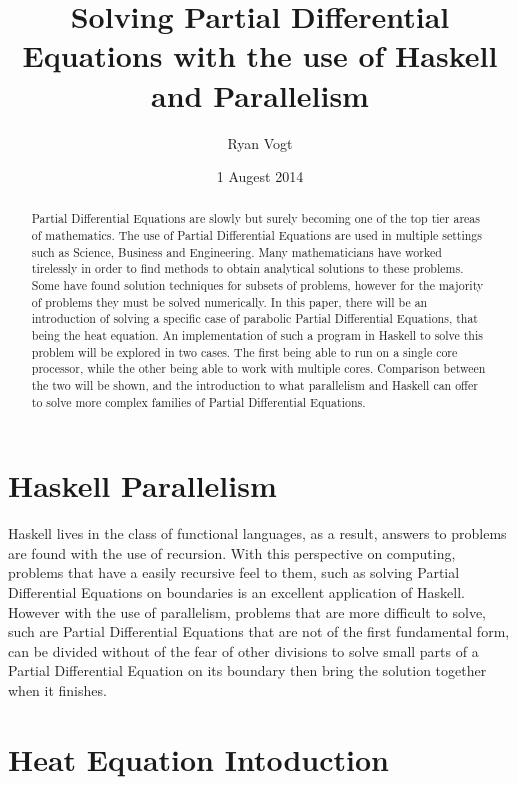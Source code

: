 \documentclass{sig-alternate}
\begin{document}
\title{Solving Partial Differential Equations with the use of Haskell and Parallelism}
\author{
\alignauthor
Ryan Vogt
}
\date{1 Augest 2014}
\maketitle
\begin{abstract}
Partial Differential Equations are slowly but surely becoming one of the top tier areas of mathematics. The use of Partial Differential Equations are used in multiple settings such as Science, Business and Engineering. Many mathematicians have worked tirelessly in order to find methods to obtain analytical solutions to these problems. Some have found solution techniques for subsets of problems, however for the majority of problems they must be solved numerically. In this paper, there will be an introduction of solving a specific case of parabolic Partial Differential Equations, that being the heat equation. An implementation of such a program in Haskell to solve this problem will be explored in two cases. The first being able to run on a single core processor, while the other being able to work with multiple cores. Comparison between the two will be shown, and the introduction to what parallelism and Haskell can offer to solve more complex families of Partial Differential Equations. 

\end{abstract}

\section{Haskell Parallelism}
\label{overview}

Haskell lives in the class of functional languages, as a result, answers to problems are found with the use of recursion. With this perspective on computing, problems that have a easily recursive feel to them, such as solving Partial Differential Equations on boundaries is an excellent application of Haskell. However with the use of parallelism, problems that are more difficult to solve, such are Partial Differential Equations that are not of the first fundamental form, can be divided without of the fear of other divisions to solve small parts of a Partial Differential Equation on its boundary then bring the solution together when it finishes.

\section{Heat Equation Intoduction}
\label{Heq}
\end{document}
